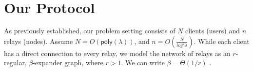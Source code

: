 






\section{Our Protocol}

As previously established, our problem setting consists of $N$ clients (users) and $n$ relays (nodes). Assume $N = O(\mathsf{poly}(\lambda))$, and $n = O(\frac{N}{log^2 \lambda})$. While each client has a direct connection to every relay, we model the network of relays as an $r$-regular, $\beta$-expander graph, where $r > 1$. We can write $\beta = \Theta(1/r)$ \cite[Section 2.3]{Hoory2006}.\\

